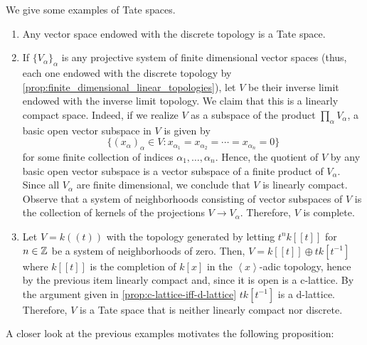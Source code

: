 \begin{example}\label{ex:tate-spaces}
We give some examples of Tate spaces.
\begin{enumerate}[label = (\alph*)]
	\item Any vector space endowed with the discrete topology is a Tate space.
	\item If $\{V_{\alpha}\}_{\alpha}$ is any projective system of finite dimensional vector spaces (thus, each one endowed with the discrete topology by \cref{prop:finite_dimensional_linear_topologies}), let $V$ be their inverse limit endowed with the inverse limit topology. We claim that this is a linearly compact space. Indeed, if we realize $V$ as a subspace of the product $\prod_{\alpha} V_{\alpha}$, a basic open vector subspace in $V$ is given by
	\[
	\{(x_{\alpha})_{\alpha} \in V \colon x_{\alpha_{1}} = x_{\alpha_{2}} = \cdots = x_{\alpha_{n}} = 0\}
	\] for some finite collection of indices $\alpha_{1}, \ldots, \alpha_{n}$. Hence, the quotient of $V$ by any basic open vector subspace is a vector subspace of a finite product of $V_{\alpha}$. Since all $V_{\alpha}$ are finite dimensional, we conclude that $V$ is linearly compact. Observe that a system of neighborhoods consisting of vector subspaces of $V$ is the collection of kernels of the projections $V \to V_{\alpha}$. Therefore, $V$ is complete.

	\item Let $V = k\left((t)\right)$ with the topology generated by letting $t^{n}k\left[[t]\right]$ for $n \in {\mathbb Z}$ be a system of neighborhoods of zero. Then, $V = k\left[[t]\right] \oplus t k[t^{-1}]$ where $k\left[[t]\right]$ is the completion of $k[x]$ in the $\left\langle x\right\rangle$-adic topology, hence by the previous item linearly compact and, since it is open is a c-lattice. By the argument given in \cref{prop:c-lattice-iff-d-lattice} $t k[t^{-1}]$ is a d-lattice. Therefore, $V$ is a Tate space that is neither linearly compact nor discrete.
	
	\end{enumerate}

\end{example}
A closer look at the previous examples motivates the following proposition:
